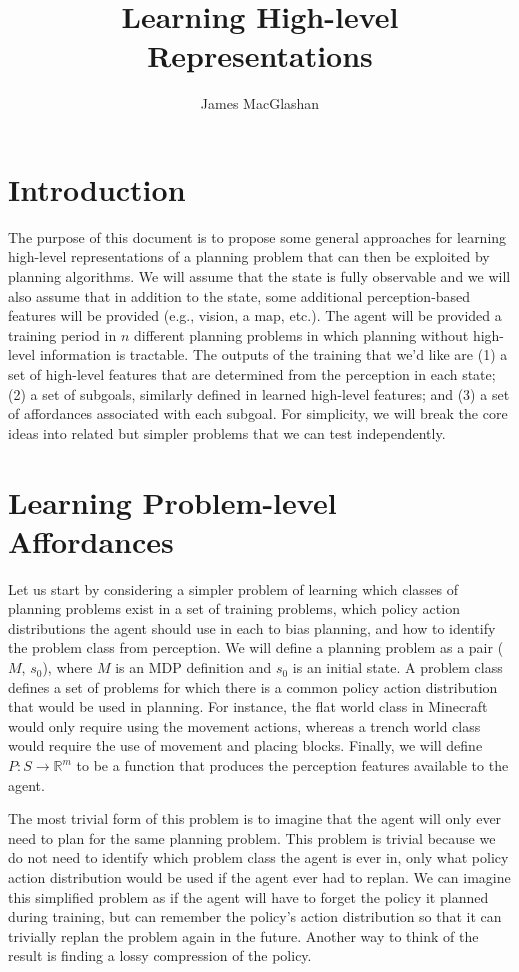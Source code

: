 \documentclass{article}
\title{Learning High-level Representations}
\author{James MacGlashan}
\date{}
\begin{document}
\maketitle
\section{Introduction}
The purpose of this document is to propose some general approaches for learning high-level representations of a planning problem that can then be exploited by planning algorithms. We will assume that the state is fully observable and we will also assume that in addition to the state, some additional perception-based features will be provided (e.g., vision, a map, etc.). The agent will be provided
a training period in $n$ different planning problems in which planning without high-level information
is tractable. The outputs of the training that we'd like are (1) a set of high-level features that are determined from the perception in each state; (2) a set of subgoals, similarly defined in learned high-level features; and (3) a set of affordances associated with each subgoal. For simplicity, we will break the core ideas into related but simpler problems that we can test independently.

\section{Learning Problem-level Affordances}
Let us start by considering a simpler problem of learning which classes of planning problems exist in a set of training problems, which policy action distributions the agent should use in each to bias planning, and how to identify the problem class from perception. We will define a planning problem as a pair ($M$, $s_0$), where $M$ is an MDP definition and $s_0$ is an initial state. A problem class defines a set of problems for which there is a common policy action distribution that would be used in planning. For instance, the flat world class in Minecraft would only require using the movement actions, whereas a trench world class would require the use of movement and placing blocks. Finally, we will define $P : S \rightarrow \mathbb{R}^m$ to be a function that produces the perception features available to the agent.

The most trivial form of this problem is to imagine that the agent will only ever need to plan for the same planning problem. This problem is trivial because we do not need to identify which problem class the agent is ever in, only what policy action distribution would be used if the agent ever had to replan. We can imagine this simplified problem as if the agent will have to forget the policy it planned during training, but can remember the policy's action distribution so that it can trivially replan the problem again in the future. Another way to think of the result is finding a lossy compression of the policy. 
\end{document}
